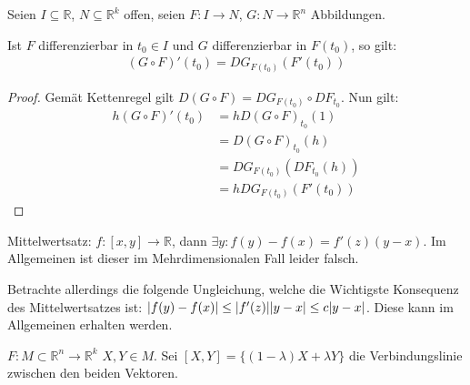 \documentclass{report}
\newcommand*{\newpar}{\par\vspace{\baselineskip}\noindent}
\newcommand{\bR}{\mathbb{R}}
\begin{document}
\begin{theorem}
 Seien $I \subseteq \bR$, $N \subseteq \bR^k$ offen, seien $F : I \to N$, $G : N \to \bR^n$ Abbildungen.
 \newpar
 Ist $F$ differenzierbar in $t_0 \in I$ und $G$ differenzierbar in $F(t_0)$, so gilt:
 \begin{align*}
  (G \circ F)'(t_0) = DG_{F(t_0)} (F'(t_0))
 \end{align*}
\end{theorem}
\begin{proof}
 Gemät Kettenregel gilt $D(G \circ F) = DG_{F(t_0)} \circ DF_{t_0}$. Nun gilt:
 \begin{align*}
  h(G \circ F)'(t_0) &= h D(G \circ F)_{t_0} (1)\\ &= D(G \circ F)_{t_0}(h)\\ &= DG_{F(t_0)}(DF_{t_0}(h))\\
  &= h DG_{F(t_0)}(F'(t_0))
 \end{align*}
\end{proof}
\newpar
Mittelwertsatz: $f : [x,y] \to \bR$, dann $\exists y : f(y) - f(x) = f'(z)(y-x)$. Im Allgemeinen ist dieser im Mehrdimensionalen Fall leider falsch.
\newpar
Betrachte allerdings die folgende Ungleichung, welche die Wichtigste Konsequenz des Mittelwertsatzes ist: $\abs{f(y) - f(x)} \leq \abs{f'(z)}\abs{y-x} \leq c \abs{y-x}$. Diese kann im Allgemeinen erhalten werden.
\newpar
$F : M \subset \bR^n \to \bR^k$ $X,Y \in M$. Sei $[X,Y] = \{(1- \lambda)X + \lambda Y\}$ die Verbindungslinie zwischen den beiden Vektoren.
\end{document}
